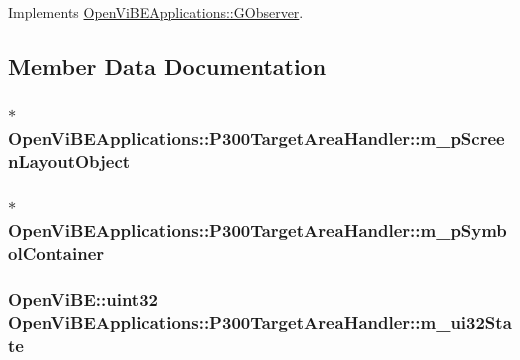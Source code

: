 Implements \hyperlink{classOpenViBEApplications_1_1GObserver_a798ae875586bc6cf2c636272a97522f5}{OpenViBEApplications::GObserver}.



\subsection{Member Data Documentation}
\hypertarget{classOpenViBEApplications_1_1P300TargetAreaHandler_a16cdcd20c52f9737efd952f0f0dad3fa}{
\subsubsection[{m\_\-pScreenLayoutObject}]{$\ast$ {\bf OpenViBEApplications::P300TargetAreaHandler::m\_\-pScreenLayoutObject}}}
\label{classOpenViBEApplications_1_1P300TargetAreaHandler_a16cdcd20c52f9737efd952f0f0dad3fa}
\hypertarget{classOpenViBEApplications_1_1P300TargetAreaHandler_a255cc9741dac7378d38d9b7df6ce6a7e}{
\subsubsection[{m\_\-pSymbolContainer}]{$\ast$ {\bf OpenViBEApplications::P300TargetAreaHandler::m\_\-pSymbolContainer}}}
\label{classOpenViBEApplications_1_1P300TargetAreaHandler_a255cc9741dac7378d38d9b7df6ce6a7e}
\hypertarget{classOpenViBEApplications_1_1P300TargetAreaHandler_a465f0f158652b367f956166847965e76}{
\subsubsection[{m\_\-ui32State}]{\setlength{\rightskip}{0pt plus 5cm}OpenViBE::uint32 {\bf OpenViBEApplications::P300TargetAreaHandler::m\_\-ui32State}}}
\label{classOpenViBEApplications_1_1P300TargetAreaHandler_a465f0f158652b367f956166847965e76}



